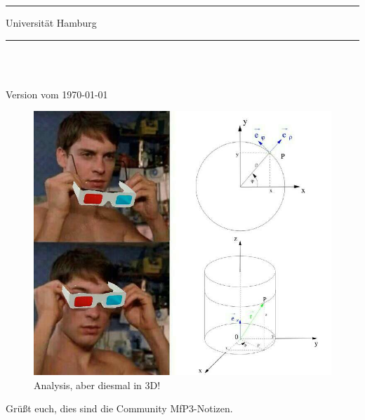 

\setlength{\abovedisplayskip}{3pt}
\setlength{\belowdisplayskip}{3pt}
\setlength{\abovedisplayshortskip}{3pt}
\setlength{\belowdisplayshortskip}{3pt}

	\thispagestyle{empty}
	\rule{\linewidth}{1pt}
	
	\vspace{6pt}				%
	
	\begin{minipage}{0.6\textwidth}
		\begin{flushleft} 
		\Profs
		\end{flushleft}
	\end{minipage}
	\begin{minipage}{0.39\textwidth}
		\begin{flushright}
			Universität Hamburg
		\end{flushright}
	\end{minipage}

	\rule{\linewidth}{1pt}\\
	\begin{center}
		\Large{\textsf{\titel}}\\
		\small\textsf{Version vom \today}
\vspace{8pt}
\end{center}


\begin{figure}[htbp]
    \centering
    \includegraphics[width=.50\textwidth]{Dateien/3D_Analysis.jpg}\\
    Analysis, aber diesmal in 3D!\\
\end{figure}
\vfill
Grüßt euch, dies sind die Community MfP3-Notizen. \\

